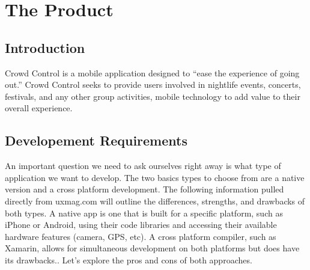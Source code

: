 


\renewcommand{\familydefault}{\sfdefault}
\renewcommand{\arraystretch}{1.5}

\chapter{The Product}

\section{Introduction}

Crowd Control is a mobile application designed to “ease the experience of going out.” Crowd Control seeks to provide users involved in nightlife events, concerts, festivals, and any other group activities, mobile technology to add value to their overall experience. 

\section{Developement Requirements}

An important question we need to ask ourselves right away is what type of application we want to develop. The two basics types to choose from are a native version and a cross platform development.  The following information pulled directly from uxmag.com will outline the differences, strengths, and drawbacks of both types.
A native app is one that is built for a specific platform, such as iPhone or Android, using their code libraries and accessing their available hardware features (camera, GPS, etc). A cross platform compiler, such as Xamarin, allows for simultaneous development on both platforms but does have its drawbacks.. Let's explore the pros and cons of both approaches.



